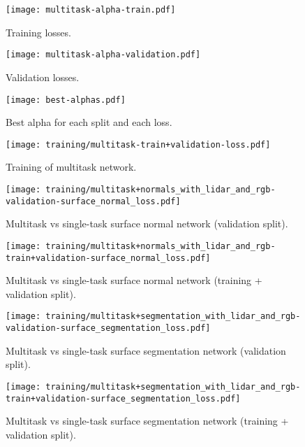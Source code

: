 \begin{figure}[H]
  \texttt{[image: multitask-alpha-train.pdf]}
  \caption{Training losses.}
\end{figure}

\begin{figure}[H]
  \texttt{[image: multitask-alpha-validation.pdf]}
  \caption{Validation losses.}
\end{figure}

\begin{figure}[H]
  \texttt{[image: best-alphas.pdf]}
  \caption{Best alpha for each split and each loss.}
\end{figure}

\begin{figure}[H]
  \texttt{[image: training/multitask-train+validation-loss.pdf]}
  \caption{Training of multitask network.}
\end{figure}

\begin{figure}[H]
  \texttt{[image: training/multitask+normals\_with\_lidar\_and\_rgb-validation-surface\_normal\_loss.pdf]}
  \caption{Multitask vs single-task surface normal network (validation split).}
\end{figure}

\begin{figure}[H]
  \texttt{[image: training/multitask+normals\_with\_lidar\_and\_rgb-train+validation-surface\_normal\_loss.pdf]}
  \caption{Multitask vs single-task surface normal network (training + validation split).}
\end{figure}

\begin{figure}[H]
  \texttt{[image: training/multitask+segmentation\_with\_lidar\_and\_rgb-validation-surface\_segmentation\_loss.pdf]}
  \caption{Multitask vs single-task surface segmentation network (validation split).}
\end{figure}

\begin{figure}[H]
  \texttt{[image: training/multitask+segmentation\_with\_lidar\_and\_rgb-train+validation-surface\_segmentation\_loss.pdf]}
  \caption{Multitask vs single-task surface segmentation network (training + validation split).}
\end{figure}
